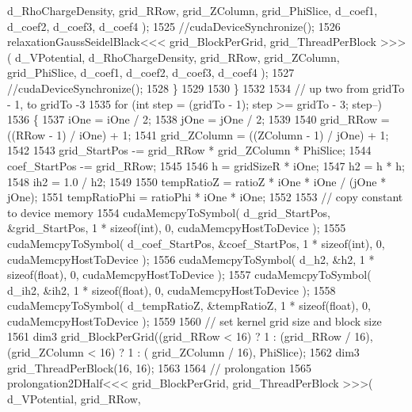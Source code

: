 \begin{DoxyCode}
      d\_RhoChargeDensity, grid\_RRow, grid\_ZColumn, grid\_PhiSlice, d\_coef1, d\_coef2, d\_coef3, d\_coef4 );
1525                 \textcolor{comment}{//cudaDeviceSynchronize();}
1526                 relaxationGaussSeidelBlack<<< grid\_BlockPerGrid, grid\_ThreadPerBlock >>>( d\_VPotential, 
      d\_RhoChargeDensity, grid\_RRow, grid\_ZColumn, grid\_PhiSlice, d\_coef1, d\_coef2, d\_coef3, d\_coef4 );
1527                 \textcolor{comment}{//cudaDeviceSynchronize();}
1528             \}
1529             
1530         \}
1532         
1534         \textcolor{comment}{// up two from gridTo - 1, to gridTo -3}
1535         \textcolor{keywordflow}{for} (\textcolor{keywordtype}{int} step = (gridTo - 1); step >= gridTo - 3; step--)
1536         \{
1537             iOne = iOne / 2;
1538             jOne = jOne / 2;
1539         
1540             grid\_RRow       = ((RRow - 1) / iOne) + 1;
1541             grid\_ZColumn    = ((ZColumn - 1) / jOne) + 1;
1542 
1543             grid\_StartPos -= grid\_RRow * grid\_ZColumn * PhiSlice;
1544             coef\_StartPos -= grid\_RRow;
1545         
1546             h   = gridSizeR * iOne;
1547             h2  = h * h;
1548             ih2 = 1.0 / h2;
1549         
1550             tempRatioZ = ratioZ * iOne * iOne / (jOne * jOne);
1551             tempRatioPhi = ratioPhi * iOne * iOne;
1552 
1553             \textcolor{comment}{// copy constant to device memory}
1554             cudaMemcpyToSymbol( d\_grid\_StartPos, &grid\_StartPos, 1 * \textcolor{keyword}{sizeof}(\textcolor{keywordtype}{int}), 0, cudaMemcpyHostToDevice
       );
1555             cudaMemcpyToSymbol( d\_coef\_StartPos, &coef\_StartPos, 1 * \textcolor{keyword}{sizeof}(\textcolor{keywordtype}{int}), 0, cudaMemcpyHostToDevice
       );
1556             cudaMemcpyToSymbol( d\_h2, &h2, 1 * \textcolor{keyword}{sizeof}(\textcolor{keywordtype}{float}), 0, cudaMemcpyHostToDevice );
1557             cudaMemcpyToSymbol( d\_ih2, &ih2, 1 * \textcolor{keyword}{sizeof}(\textcolor{keywordtype}{float}), 0, cudaMemcpyHostToDevice );
1558             cudaMemcpyToSymbol( d\_tempRatioZ, &tempRatioZ, 1 * \textcolor{keyword}{sizeof}(\textcolor{keywordtype}{float}), 0, cudaMemcpyHostToDevice );
1559 
1560             \textcolor{comment}{// set kernel grid size and block size}
1561             dim3 grid\_BlockPerGrid((grid\_RRow < 16) ? 1 : (grid\_RRow / 16), (grid\_ZColumn < 16) ? 1 : (
      grid\_ZColumn / 16), PhiSlice);
1562             dim3 grid\_ThreadPerBlock(16, 16);
1563     
1564             \textcolor{comment}{// prolongation}
1565             prolongation2DHalf<<< grid\_BlockPerGrid, grid\_ThreadPerBlock >>>( d\_VPotential, grid\_RRow, 

\end{DoxyCode}
